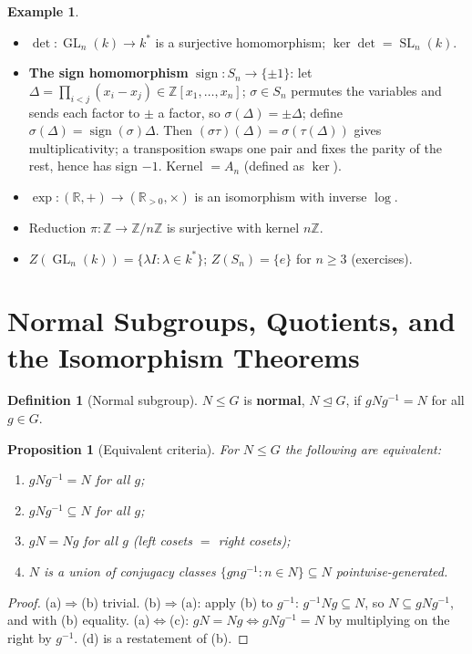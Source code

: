 \documentclass[11pt,a4paper]{article}
\newtheorem{proposition}[theorem]{Proposition}
\theoremstyle{definition}
\newtheorem{definition}[theorem]{Definition}
\newtheorem{example}[theorem]{Example}
\newcommand{\Z}{\mathbb{Z}}
\newcommand{\R}{\mathbb{R}}
\newcommand{\GL}{\operatorname{GL}}
\newcommand{\SL}{\operatorname{SL}}
\begin{document}
	\begin{example}\label{ex:homs}
		\begin{itemize}
			\item $\det:\GL_n(k)\to k^*$ is a surjective homomorphism; $\ker\det=\SL_n(k)$.
			\item \textbf{The sign homomorphism} $\operatorname{sign}:S_n\to\{\pm1\}$: let
			$\Delta=\prod_{i<j}(x_i-x_j)\in\Z[x_1,\dots,x_n]$; $\sigma\in S_n$ permutes the variables and sends
			each factor to $\pm$ a factor, so $\sigma(\Delta)=\pm\Delta$; define $\sigma(\Delta)=\operatorname{sign}(\sigma)\Delta$.
			Then $(\sigma\tau)(\Delta)=\sigma(\tau(\Delta))$ gives multiplicativity; a transposition swaps one
			pair and fixes the parity of the rest, hence has sign $-1$. Kernel $=A_n$ (defined as $\ker$).
			\item $\exp:(\R,+)\to(\R_{>0},\times)$ is an isomorphism with inverse $\log$.
			\item Reduction $\pi:\Z\to\Z/n\Z$ is surjective with kernel $n\Z$.
			\item $Z(\GL_n(k))=\{\lambda I:\lambda\in k^*\}$; $Z(S_n)=\{e\}$ for $n\ge3$ (exercises).
		\end{itemize}
	\end{example}
	
	\section{Normal Subgroups, Quotients, and the Isomorphism Theorems}
	
	\begin{definition}[Normal subgroup]
		$N\le G$ is \textbf{normal}, $N\trianglelefteq G$, if $gNg^{-1}=N$ for all $g\in G$.
	\end{definition}
	
	\begin{proposition}[Equivalent criteria]\label{prop:normal}
		For $N\le G$ the following are equivalent:
		\begin{enumerate}[label=(\alph*)]
			\item $gNg^{-1}=N$ for all $g$;
			\item $gNg^{-1}\subseteq N$ for all $g$;
			\item $gN=Ng$ for all $g$ (left cosets $=$ right cosets);
			\item $N$ is a union of conjugacy classes $\{gng^{-1}:n\in N\}\subseteq N$ pointwise-generated.
		\end{enumerate}
	\end{proposition}
	\begin{proof}
		(a)$\Rightarrow$(b) trivial. (b)$\Rightarrow$(a): apply (b) to $g^{-1}$: $g^{-1}Ng\subseteq N$, so
		$N\subseteq gNg^{-1}$, and with (b) equality. (a)$\Leftrightarrow$(c): $gN=Ng\iff gNg^{-1}=N$ by
		multiplying on the right by $g^{-1}$. (d) is a restatement of (b).
	\end{proof}
	
\end{document}

